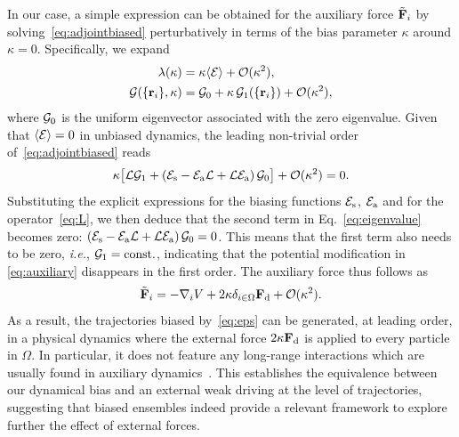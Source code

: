 \documentclass[superscriptaddress, twocolumn, prx, longbibliography, nofootinbib]{revtex4-1}
\newcommand{\tn}[1]{{\color{red}#1}}
\begin{document}
In our case, a simple expression can be obtained for the auxiliary force $\tilde{\bf F}_i$ by solving~\eqref{eq:adjointbiased} perturbatively in terms of the bias parameter $\kappa$ \tn{around $\kappa=0$}. Specifically, we expand
\begin{equation}
	\begin{aligned}
		\lambda(\kappa) &= \kappa \langle{\cal E}\rangle + {\cal O}(\kappa^2) ,
		\\
		{\cal G}(\{{\bf r}_i\},\kappa) &= {\cal G}_0 + \kappa\,{\cal G}_1(\{{\bf r}_i\}) + {\cal O}(\kappa^2) ,
	\end{aligned}
\end{equation}
where ${\cal G}_0$ is the uniform eigenvector associated with the zero eigenvalue. Given that $\langle{\cal E}\rangle=0$ \tn{in unbiased dynamics},  %
the leading non-trivial order of~\eqref{eq:adjointbiased} reads
\tn{
\begin{equation}\label{eq:eigenvalue}
	\kappa\big[{\cal L}{\cal G}_1 +  \left ( {\cal E}_{\rm s} - {\cal E}_{\rm a} {\cal L}
	+ {\cal L} {\cal E}_{\rm a} \right )
	{\cal G}_0 \big] 
	+ {\cal O}(\kappa^2) = 0 .
\end{equation}}
Substituting the explicit expressions for the biasing 
\tn{functions ${\cal E}_{\rm s}$, ${\cal E}_{\rm a}$}
and for the operator~\eqref{eq:L}, we then deduce that 
\tn{the second term in Eq.~\eqref{eq:eigenvalue} becomes zero: $\left ( {\cal E}_{\rm s} - {\cal E}_{\rm a} {\cal L}
	+ {\cal L} {\cal E}_{\rm a} \right )
	{\cal G}_0=0$. 
This means that the first term also needs to be zero, {\it i.e.}, ${\cal G}_1=\rm const.$, indicating that the potential modification in \eqref{eq:auxiliary} disappears in the first order.}
The auxiliary force thus follows as
\begin{equation}\label{eq:V}
	\tilde{\bf F}_i = - \nabla_i V + 2\kappa \delta_{i\in\Omega} {\bf F}_{\rm d} + {\cal O}(\kappa^2) .
\end{equation}
As a result, the trajectories biased by~\eqref{eq:eps} can be generated, at leading order, in a physical dynamics where the external force $2\kappa{\bf F}_{\rm d}$ is applied to every particle in $\Omega$. In particular, it does not feature any long-range interactions which are usually found in auxiliary dynamics~\cite{Jack2015}. This establishes the equivalence between our dynamical bias and an external weak driving at the level of trajectories, suggesting that biased ensembles indeed provide a relevant framework to explore further the effect of external forces.
\end{document}
